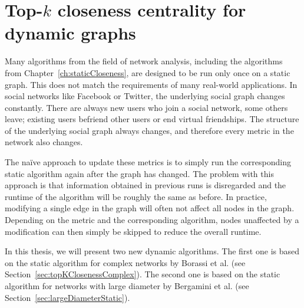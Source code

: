 \chapter{Top-$k$ closeness centrality for dynamic graphs}
\label{ch:dynamicCloseness}

Many algorithms from the field of network analysis, including the algorithms from Chapter~\ref{ch:staticCloseness}, are designed to be run only once on a static graph. This does not match the requirements of many real-world applications. In social networks like Facebook or Twitter, the underlying social graph changes constantly. There are always new users who join a social network, some others leave; existing users befriend other users or end virtual friendships. The structure of the underlying social graph always changes, and therefore every metric in the network also changes.

The na\"ive approach to update these metrics is to simply run the corresponding static algorithm again after the graph has changed. The problem with this approach is that information obtained in previous runs is disregarded and the runtime of the algorithm will be roughly the same as before. In practice, modifying a single edge in the graph will often not affect all nodes in the graph. Depending on the metric and the corresponding algorithm, nodes unaffected by a modification can then simply be skipped to reduce the overall runtime.

In this thesis, we will present two new dynamic algorithms. The first one is based on the static algorithm for complex networks by Borassi et al. (see Section~\ref{sec:topKClosenessComplex}). The second one is based on the static algorithm for networks with large diameter by Bergamini et al. (see Section~\ref{sec:largeDiameterStatic}).

